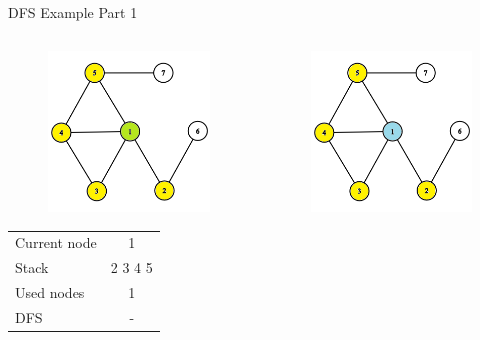 \documentclass[aspectratio=169]{beamer}%
\begin{document}
\begin{frame}{DFS Example Part 1}
\begin{columns}
\begin{column}{0.32\textwidth}
\begin{figure}[!ht]
                \includegraphics[width=0.9\linewidth]{dfs 2.png}
            \end{figure}
            \begin{table}[ht]
                \centering
                \begin{tabular}{l c}
                    Current node & 1\\
                    Stack & 2 3 4 5 \\ 
                    Used nodes & 1\\
                    DFS & -
                \end{tabular}
            \end{table}
        \end{column}
        \hfill
        \begin{column}{0.32\textwidth}
            \begin{figure}[!ht]
                \centering
                \includegraphics[width=0.9\linewidth]{dfs 3.png}

\end{figure}
\end{column}
\end{columns}
\end{frame}
\end{document}
